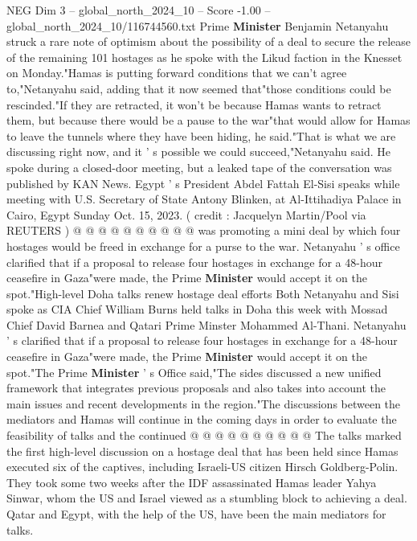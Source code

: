 \begin{textsample}{NEG Dim 3 – global\_north\_2024\_10 – Score -1.00 – global\_north\_2024\_10/116744560.txt}  \label{ex:f3_neg_336}
Prime \textbf{Minister} Benjamin Netanyahu struck a rare note of optimism about the possibility of a deal to secure the release of the remaining 101 hostages as he spoke with the Likud faction in the Knesset on Monday."Hamas is putting forward conditions that we can't agree to,"Netanyahu said, adding that it now seemed that"those conditions could be rescinded."If they are retracted, it won't be because Hamas wants to retract them, but because there would be a pause to the war"that would allow for Hamas to leave the tunnels where they have been hiding, he said."That is what we are discussing right now, and it ' s possible we could succeed,"Netanyahu said.
He spoke during a closed-door meeting, but a leaked tape of the conversation was published by KAN News.
Egypt ' s President Abdel Fattah El-Sisi speaks while meeting with U.S.
Secretary of State Antony Blinken, at Al-Ittihadiya Palace in Cairo, Egypt Sunday Oct. 15, 2023. ( credit : Jacquelyn Martin/Pool via REUTERS ) @ @ @ @ @ @ @ @ @ @ was promoting a mini deal by which four hostages would be freed in exchange for a purse to the war.
Netanyahu ' s office clarified that if a proposal to release four hostages in exchange for a 48-hour ceasefire in Gaza"were made, the Prime \textbf{Minister} would accept it on the spot."High-level Doha talks renew hostage deal efforts Both Netanyahu and Sisi spoke as CIA Chief William Burns held talks in Doha this week with Mossad Chief David Barnea and Qatari Prime Minster Mohammed Al-Thani.
Netanyahu ' s clarified that if a proposal to release four hostages in exchange for a 48-hour ceasefire in Gaza"were made, the Prime \textbf{Minister} would accept it on the spot."The Prime \textbf{Minister} ' s Office said,"The sides discussed a new unified framework that integrates previous proposals and also takes into account the main issues and recent developments in the region."The discussions between the mediators and Hamas will continue in the coming days in order to evaluate the feasibility of talks and the continued @ @ @ @ @ @ @ @ @ @ The talks marked the first high-level discussion on a hostage deal that has been held since Hamas executed six of the captives, including Israeli-US citizen Hirsch Goldberg-Polin.
They took some two weeks after the IDF assassinated Hamas leader Yahya Sinwar, whom the US and Israel viewed as a stumbling block to achieving a deal.
Qatar and Egypt, with the help of the US, have been the main mediators for talks.

\end{textsample}
